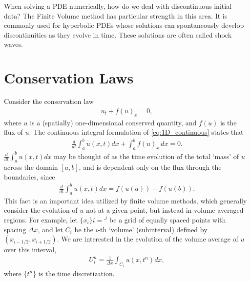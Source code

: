 \label{lab:finitevolume}

When solving a PDE numerically, how do we deal with discontinuous initial data? The Finite Volume method has particular strength in this area. It is commonly used for hyperbolic PDEs whose solutions can spontaneously develop discontinuities as they evolve in time. These solutions are often called shock waves. 

\section*{Conservation Laws}
Consider the conservation law
\begin{align}\label{eq:1D_continuous}
u_t + f(u)_x = 0,
\end{align}
where $u$ is a (spatially) one-dimensional conserved quantity, and $f(u)$ is the flux of $u$.  The continuous integral formulation of  \eqref{eq:1D_continuous} states that 
\begin{align*}
	\frac{d}{dt}\int_a^b u(x,t) dx + \int_a^b f(u)_x \,dx = 0.
\end{align*}
$\frac{d}{dt}\int_a^b u(x,t) dx$ may be thought of as the time evolution of the total `mass' of $u$ across the domain $[a,b]$, and is 
 dependent only on the flux through the boundaries, since 
\begin{align*}
\frac{d}{dt}\int_a^b u(x,t) dx = f(u(a))-f(u(b)).
\end{align*}
This fact is an important idea utilized by finite volume methods, which generally consider the evolution of $u$ not at a given point, but instead in volume-averaged regions.  For example, let $\{x_i\}{i = }^J$ be a grid of equally spaced points with spacing  $\Delta x$, and let $C_i$ be the $i$-th `volume' (subinterval) defined by $(x_{i-1/2},x_{i+1/2})$. We are interested in the evolution of the volume average of $u$ over this interval,
\begin{align*}
U_i^n  = \frac{1}{\Delta x}\int_{C_i} u(x,t^n)dx,
\end{align*}
where $\{t^n\}$ is the time discretization.

